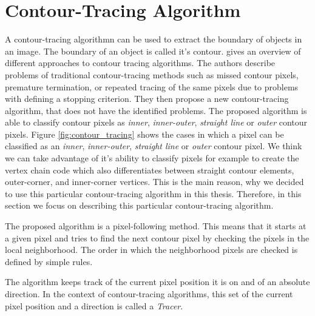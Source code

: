\documentclass[thesis.tex]{subfiles}
\begin{document}
\section{Contour-Tracing Algorithm} 
\label{contourtracingalgorithm}
A contour-tracing algorithmn can be used to extract the boundary of objects in an image. The boundary of an object is called it's contour. \cite{seo2016fast} gives an overview of different approaches to contour tracing algorithms. The authors describe problems of traditional contour-tracing methods such as missed contour pixels, premature termination, or repeated tracing of the same pixels due to problems with defining a stopping criterion. They then propose a new contour-tracing algorithm, that does not have the identified problems. The proposed algorithm is able to classify contour pixels as \textit{inner}, \textit{inner-outer}, \textit{straight line} or \textit{outer} contour pixels. Figure \ref{fig:contour_tracing} shows the cases in which a pixel can be classified as an \textit{inner}, \textit{inner-outer}, \textit{straight line} or \textit{outer} contour pixel. We think we can take advantage of it's ability to classify pixels for example to create the vertex chain code which also differentiates between straight contour elements, outer-corner, and  inner-corner vertices. This is the main reason, why we decided to use this particular contour-tracing algorithm in this thesis. Therefore, in this section we focus on describing this particular contour-tracing algorithm.

The proposed algorithm is a pixel-following method. This means that it starts at a given pixel and tries to find the next contour pixel by checking the pixels in the local neighborhood. The order in which the neighborhood pixels are checked is defined by simple rules. 

The algorithm keeps track of the current pixel position it is on and of an absolute direction. In the context of contour-tracing algorithms, this set of the current pixel position and a direction is called a \textit{Tracer}. \newpage

\newcommand{\figcontourwidth}{3.5}
\newcommand{\figcontourfirstOffset}{0}
\newcommand{\figcontousecondOffset}{4.5}
\newcommand{\figcontouthirdOffset}{9}
\newcommand{\figcontoufourthOffset}{13.5}
\newcommand{\figcontousecondRowYOffset}{4.5}	
\end{document}
